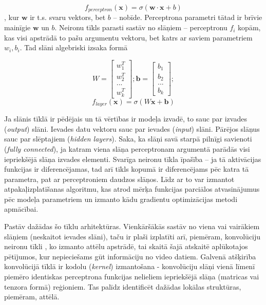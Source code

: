 \documentclass[12pt, a4paper]{article}
\numberwithin{equation}{section} %
\begin{document}
\begin{equation} 
    f_{perceptron}( \boldsymbol{x}) = \sigma( \boldsymbol{w} \cdot  \boldsymbol{x}+b)
\end{equation}
, kur $ \boldsymbol{w}$ ir t.s. svaru vektors, bet $b$ --  nobīde. Perceptrona parametri tātad ir brīvie mainīgie $ \boldsymbol{w}$ un $b$. Neironu tīkls parasti sastāv no slāņiem -- perceptronu $f_i$ kopām, kas visi apstrādā to pašu argumentu vektoru, bet katrs ar saviem parametriem $w_i,b_i$. Tad slāni algebriski izsaka formā

\begin{equation} 
    W = \begin{bmatrix}
        w_1^T \\
        w_2^T \\
        ... \\
        w_k^T
    \end{bmatrix}; 
     \boldsymbol{b} =  \begin{bmatrix}
        b_1 \\
        b_2 \\
        ... \\
        b_k
    \end{bmatrix}; 
\end{equation}
\begin{equation} 
    f_{layer}( \boldsymbol{x}) = \sigma(W \boldsymbol{x}+ \boldsymbol{b})
\end{equation}

Ja slānis tīklā ir pēdējais un tā vērtības ir modeļa izvadē, to sauc par izvades (\textit{output}) slāni. Ievades datu vektoru sauc par ievades (\textit{input}) slāni. Pārējos slāņus sauc par slēptajiem (\textit{hidden layers}). Saka, ka slāņi savā starpā pilnīgi savienoti (\textit{fully connected}), ja katram viena slāņa perceptronam argumentā parādās visi iepriekšējā slāņa izvades elementi. Svarīga neironu tīkla īpašība -- ja tā aktivācijas funkcijas ir diferencējamas, tad arī tīkls kopumā ir diferencējams pēc katra tā parametra, pat ar perceptroniem daudzos slāņos. Līdz ar to var izmantot atpakaļizplatīšanas algoritmu, kas atrod mērķa funkcijas parciālos atvasinājumus pēc modeļa parametriem un izmanto kādu gradientu optimizācijas metodi apmācībai.

Pastāv dažādas šo tīklu arhitektūras. Vienkāršākās sastāv no viena vai vairākiem slāņiem (neskaitot ievades slāni), taču ir plaši izplatīti arī, piemēram, konvolūciju neironu tīkli \cite{krizhevsky2012imagenet}, ko izmanto attēlu apstrādē, tai skaitā šajā atskaitē aplūkotajos pētījumos, kur nepieciešams gūt informāciju no video datiem. Galvenā atšķirība konvolūcijā tīklā ir kodolu (\textit{kernel}) izmantošana - konvolūciju slāņi vienā līmenī piemēro identiskas perceptrona funkcijas nelieliem iepriekšējā slāņa (matricas vai tenzora formā) reģioniem. Tas palīdz identificēt dažādas lokālas struktūras, piemēram, attēlā. 
\end{document}
